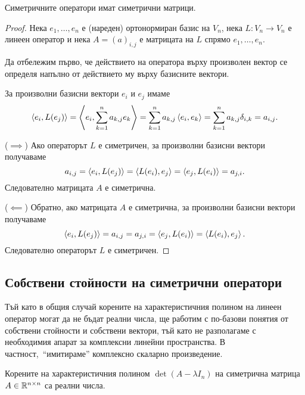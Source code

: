 \documentclass[numbers=endperiod, DIV=15, bibliography=totocnumbered]{scrartcl}
\begin{document}
\begin{theorem}
  Симетричните оператори имат симетрични матрици.
\end{theorem}
\begin{proof}
  Нека $e_1, \ldots, e_n$ е (нареден) ортонормиран базис на $V_n$, нека $L: V_n \to V_n$ е линеен оператор и нека $A = {(a)}_{i,j}$ е матрицата на $L$ спрямо $e_1, \ldots, e_n$.

  Да отбележим първо, че действието на оператора върху произволен вектор се определя напълно от действието му върху базисните вектори.

  За произволни базисни вектори $e_i$ и $e_j$ имаме
  \begin{align*}
    \left\langle e_i, L(e_j) \right\rangle
    =
    \left\langle e_i, \sum_{k=1}^n a_{k,j} e_k \right\rangle
    =
    \sum_{k=1}^n a_{k,j} \left\langle e_i, e_k \right\rangle
    =
    \sum_{k=1}^n a_{k,j} \delta_{i,k}
    =
    a_{i,j}.
  \end{align*}

  ($\implies$) Ако операторът $L$ е симетричен, за произволни базисни вектори получаваме
  \begin{displaymath}
    a_{i,j}
    =
    \left\langle e_i, L(e_j) \right\rangle
    =
    \left\langle L(e_i), e_j \right\rangle
    =
    \left\langle e_j, L(e_i) \right\rangle
    =
    a_{j,i}.
  \end{displaymath}
  Следователно матрицата $A$ е симетрична.

  ($\impliedby$) Обратно, ако матрицата $A$ е симетрична, за произволни базисни вектори получаваме
  \begin{displaymath}
    \left\langle e_i, L(e_j) \right\rangle
    =
    a_{i,j}
    =
    a_{j,i}
    =
    \left\langle e_j, L(e_i) \right\rangle
    =
    \left\langle L(e_i), e_j \right\rangle.
  \end{displaymath}
  Следователно операторът $L$ е симетричен.
\end{proof}

\subsection{Собствени стойности на симетрични оператори}

Тъй като в общия случай корените на характеристичния полином на линеен оператор могат да не бъдат реални числа, ще работим с по-базови понятия от собствени стойности и собствени вектори, тъй като не разполагаме с необходимия апарат за комплексни линейни пространства. В частност,~\enquote{имитираме} комплексно скаларно произведение.

\begin{theorem}
  Корените на характеристичния полином $\det(A - \lambda I_n)$ на симетрична матрица $A \in \mathbb{R}^{n \times n}$ са реални числа.
\end{theorem}
\end{document}
